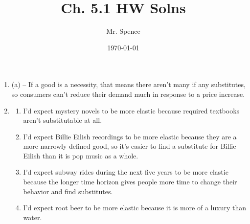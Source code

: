 \documentclass{article}
\title{Ch. 5.1 HW Solns}
\author{Mr. Spence}
\date{\today}
\begin{document}
\maketitle

\begin{enumerate}

\item (a) -- If a good is a necessity, that means there aren't many if any substitutes, so consumers can't reduce their demand much in response to a price increase. 

\setcounter{enumi}{0}

\item

	\begin{enumerate}
	
	\item I'd expect mystery novels to be more elastic because required textbooks aren't substitutable at all.
	
	\item I'd expect Billie Eilish recordings to be more elastic because they are a more narrowly defined good, so it's easier to find a substitute for Billie Eilish than it is pop music as a whole.
	
	\item I'd expect subway rides during the next five years to be more elastic because the longer time horizon gives people more time to change their behavior and find substitutes.
	
	\item I'd expect root beer to be more elastic because it is more of a luxury than water. 
	
	\end{enumerate}

\end{enumerate}
\end{document}
